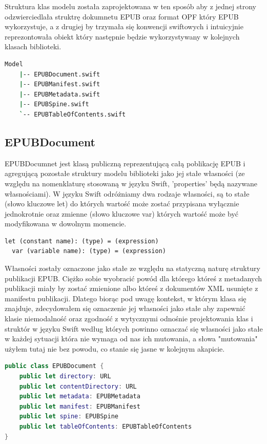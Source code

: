 Struktura klas modelu została zaprojektowana w ten sposób aby z jednej strony odzwierciedlała struktrę dokumnetu EPUB oraz format OPF który EPUB wykorzystuje, a z drugiej by trzymała się konwencji swiftowych i intuicyjnie reprezontowała obiekt który następnie będzie wykorzystywany w kolejnych klasach biblioteki.

\begin{lstlisting}[caption={Struktura modelu EPUBKit.}, language=bash]
    Model
    |-- EPUBDocument.swift
    |-- EPUBManifest.swift
    |-- EPUBMetadata.swift
    |-- EPUBSpine.swift
    `-- EPUBTableOfContents.swift
\end{lstlisting}

\subsection{EPUBDocument}

EPUBDocumnet jest klasą publiczną reprezentującą całą poblikację EPUB i agregującą pozostałe struktury modelu biblioteki jako jej stałe własności (ze względu na nomenklaturę stosowaną w języku Swift, 'properties' będą nazywane własnościami). W języku Swift odróżniamy dwa rodzaje własności, są to stałe (słowo kluczowe let) do których wartość może zostać przypisana wyłącznie jednokrotnie oraz zmienne (słowo kluczowe var) których wartość może być modyfikowana w dowolnym momencie.

\begin{lstlisting}[caption={Deklaracje własności w Swifcie.\cite{theSwiftProgrammingLanguageDeclarations}}, language=swift-reference]
  let (constant name): (type) = (expression)
  var (variable name): (type) = (expression)
\end{lstlisting}

Własności zostały oznaczone jako stałe ze względu na statyczną naturę struktury publikacji EPUB. Ciężko sobie wyobracić powód dla którego któreś z metadanych publikacji miały by zostać zmienione albo któreś z dokumentów XML usunięte z manifestu publikacji. Dlatego biorąc pod uwagę kontekst, w którym klasa się znajduje, zdecydowałem się oznaczenie jej własności jako stałe aby zapewnić klasie niemodalność oraz zgodność z wytycznymi odnośnie projektowania klas i struktór w języku Swift według których powinno oznaczać się własności jako stałe w każdej sytuacji która nie wymaga od nas ich mutowania, a słowa "mutowania" użyłem tutaj nie bez powodu, co stanie się jasne w kolejnym akapicie.

\begin{lstlisting}[caption={Klasa EPUBDocument i jej stałe publiczne.}, language=swift]
public class EPUBDocument {
    public let directory: URL
    public let contentDirectory: URL
    public let metadata: EPUBMetadata
    public let manifest: EPUBManifest
    public let spine: EPUBSpine
    public let tableOfContents: EPUBTableOfContents
}
\end{lstlisting}

